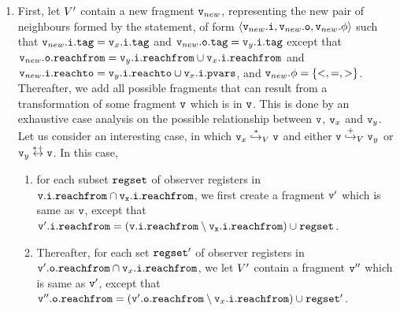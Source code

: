 \begin{enumerate}
  \item
    First, let $V'$ contain a new fragment $\mathtt{v}_{new}$, representing
    the new pair of neighbours formed by the statement, of form
    $\left\langle\mathtt{v}_{new}.\mathtt{i},\mathtt{v}_{new}.\mathtt{o},\mathtt{v}_{new}.\phi\right\rangle$ such that
    $\mathtt{v}_{new}.\mathtt{i}.\mathtt{tag} = \mathtt{v}_x.\mathtt{i}.\mathtt{tag}$ and
    $\mathtt{v}_{new}.\mathtt{o}.\mathtt{tag} = \mathtt{v}_y.\mathtt{i}.\mathtt{tag}$ except that
    $\mathtt{v}_{new}.\mathtt{o}.\mathtt{reachfrom} = \mathtt{v}_y.\mathtt{i}.\mathtt{reachfrom} \cup \mathtt{v}_x.\mathtt{i}.\mathtt{reachfrom}$ and
    $\mathtt{v}_{new}.\mathtt{i}.\mathtt{reachto} = \mathtt{v}_y.\mathtt{i}.\mathtt{reachto} \cup \mathtt{v}_x.\mathtt{i}.\mathtt{pvars}$, and
    $\mathtt{v}_{new}.\phi = \left\{<,=,>\right\}$.
Thereafter, we add all possible fragments that can result from a transformation
of some fragment $\mathtt{v}$ which is in $\mathtt{v}$. This is done by an exhaustive
case analysis on the possible
relationship between $\mathtt{v}$, $\mathtt{v}_x$ and $\mathtt{v}_y$.
Let us consider an interesting case, in which
$\mathtt{v}_x \overset{*}\hookrightarrow_{V} \mathtt{v}$ and either $\mathtt{v} \overset{+}\hookrightarrow_{V} \mathtt{v}_y$ or $\mathtt{v}_y \overset{*+}\leftrightarrow \mathtt{v}$.
In this case,
\begin{enumerate}
\item
  for each subset $\mathtt{regset}$ of observer registers in $\tt \mathtt{v}.\mathtt{i}.\mathtt{reachfrom} \cap \mathtt{v}_x.\mathtt{i}.\mathtt{reachfrom}$, we first create
  a fragment $\mathtt{v}'$ which is same as $\mathtt{v}$, except that $\mathtt{v}'.\mathtt{i}.\mathtt{reachfrom} = (\tt \mathtt{v}.\mathtt{i}.\mathtt{reachfrom} \setminus \mathtt{v}_x.\mathtt{i}.\mathtt{reachfrom}) \cup \mathtt{regset}$.
\item
  Thereafter, 
for each set $\mathtt{regset}'$ of observer registers in $\mathtt{v}'.\mathtt{o}.\mathtt{reachfrom} \cap \mathtt{v}_x.\mathtt{i}.\mathtt{reachfrom}$,  we let $V'$ contain a fragment
$\mathtt{v}''$ which is same as $\mathtt{v}'$, except that $\mathtt{v}''.\mathtt{o}.\mathtt{reachfrom} = (\mathtt{v}'.\mathtt{o}.\mathtt{reachfrom} \setminus \mathtt{v}_x.\mathtt{i}.\mathtt{reachfrom}) \cup \mathtt{regset}'$. 
\end{enumerate}
\end{enumerate}

